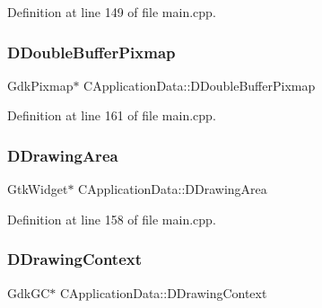 Definition at line 149 of file main.\+cpp.

\hypertarget{classCApplicationData_aefb64ec5ca3f791f6d431cfc56b9f3b3}{}\label{classCApplicationData_aefb64ec5ca3f791f6d431cfc56b9f3b3} 
\subsubsection{\texorpdfstring{D\+Double\+Buffer\+Pixmap}{DDoubleBufferPixmap}}
{\footnotesize\ttfamily Gdk\+Pixmap$\ast$ C\+Application\+Data\+::\+D\+Double\+Buffer\+Pixmap\hspace{0.3cm}{\ttfamily [protected]}}



Definition at line 161 of file main.\+cpp.

\hypertarget{classCApplicationData_a4735f5d31632313e0b2a1659eb178987}{}\label{classCApplicationData_a4735f5d31632313e0b2a1659eb178987} 
\subsubsection{\texorpdfstring{D\+Drawing\+Area}{DDrawingArea}}
{\footnotesize\ttfamily Gtk\+Widget$\ast$ C\+Application\+Data\+::\+D\+Drawing\+Area\hspace{0.3cm}{\ttfamily [protected]}}



Definition at line 158 of file main.\+cpp.

\hypertarget{classCApplicationData_aa6c5bea9bdcc64398e5a3f693661d37c}{}\label{classCApplicationData_aa6c5bea9bdcc64398e5a3f693661d37c} 
\subsubsection{\texorpdfstring{D\+Drawing\+Context}{DDrawingContext}}
{\footnotesize\ttfamily Gdk\+GC$\ast$ C\+Application\+Data\+::\+D\+Drawing\+Context\hspace{0.3cm}{\ttfamily [protected]}}




